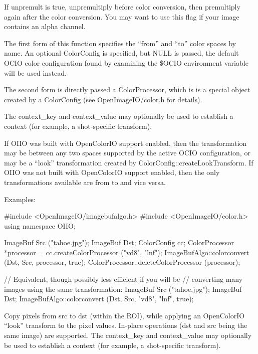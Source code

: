 If {\cf unpremult} is {\cf true}, unpremultiply before color conversion,
then premultiply again after the color conversion.  You may want to use
this flag if your image contains an alpha channel.

The first form of this function specifies the ``from'' and ``to'' color
spaces by name. An optional {\cf ColorConfig} is specified, but {\cf NULL}
is passed, the default OCIO color configuration found by examining the {\cf
\$OCIO} environment variable will be used instead.

The second form is directly passed a {\cf ColorProcessor}, which is is a
special object created by a {\cf ColorConfig} (see {\cf OpenImageIO/color.h}
for details).

The {\cf context_key} and {\cf context_value} may optionally be used
to establish a context (for example, a shot-specific transform).

If OIIO was built with OpenColorIO support enabled, then the transformation
may be between any two spaces supported by the active OCIO configuration, or
may be a ``look'' transformation created by {\cf
ColorConfig::createLookTransform}.  If OIIO was not built with OpenColorIO
support enabled, then the only transformations available are from 
to  and vice versa.

\smallskip
\noindent Examples:
\begin{code}
    #include <OpenImageIO/imagebufalgo.h>
    #include <OpenImageIO/color.h>
    using namespace OIIO;

    ImageBuf Src ("tahoe.jpg");
    ImageBuf Dst;
    ColorConfig cc;
    ColorProcessor *processor = cc.createColorProcessor ("vd8", "lnf");
    ImageBufAlgo::colorconvert (Dst, Src, processor, true);
    ColorProcessor::deleteColorProcessor (processor);

    // Equivalent, though possibly less efficient if you will be
    // converting many images using the same transformation:
    ImageBuf Src ("tahoe.jpg");
    ImageBuf Dst;
    ImageBufAlgo::colorconvert (Dst, Src, "vd8", "lnf", true);
\end{code}
\apiend

 
Copy pixels from {\cf src} to {\cf dst} (within the ROI), while
applying an OpenColorIO ``look'' transform to the pixel values.
In-place operations ({\cf dst} and {\cf src} being the same image)
are supported.  The {\cf context_key} and {\cf context_value} may optionally be used
to establish a context (for example, a shot-specific transform).

